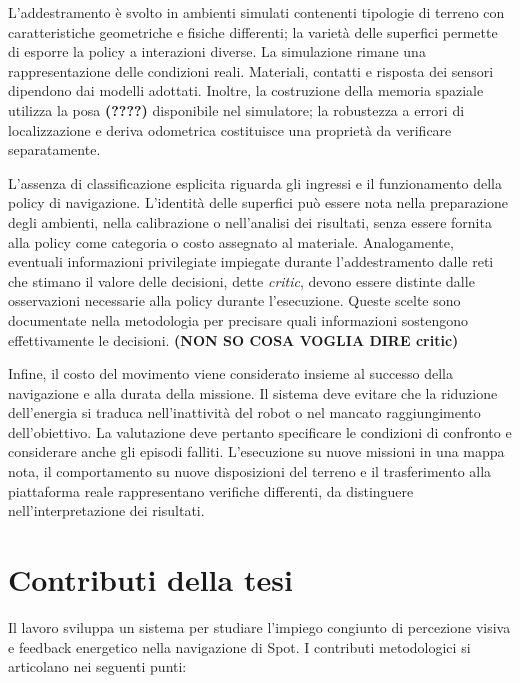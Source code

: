 L'addestramento è svolto in ambienti simulati contenenti tipologie di terreno con caratteristiche geometriche e fisiche differenti; la varietà delle superfici permette di esporre la policy a interazioni diverse. La simulazione rimane una rappresentazione delle condizioni reali. Materiali, contatti e risposta dei sensori dipendono dai modelli adottati. Inoltre, la costruzione della memoria spaziale utilizza la posa \textbf{(????)} disponibile nel simulatore; la robustezza a errori di localizzazione e deriva odometrica costituisce una proprietà da verificare separatamente.

L'assenza di classificazione esplicita riguarda gli ingressi e il funzionamento della policy di navigazione. L'identità delle superfici può essere nota nella preparazione degli ambienti, nella calibrazione o nell'analisi dei risultati, senza essere fornita alla policy come categoria o costo assegnato al materiale. Analogamente, eventuali informazioni privilegiate impiegate durante l'addestramento dalle reti che stimano il valore delle decisioni, dette \emph{critic}, devono essere distinte dalle osservazioni necessarie alla policy durante l'esecuzione. Queste scelte sono documentate nella metodologia per precisare quali informazioni sostengono effettivamente le decisioni. \textbf{(NON SO COSA VOGLIA DIRE critic)}

Infine, il costo del movimento viene considerato insieme al successo della navigazione e alla durata della missione. Il sistema deve evitare che la riduzione dell'energia si traduca nell'inattività del robot o nel mancato raggiungimento dell'obiettivo. La valutazione deve pertanto specificare le condizioni di confronto e considerare anche gli episodi falliti. L'esecuzione su nuove missioni in una mappa nota, il comportamento su nuove disposizioni del terreno e il trasferimento alla piattaforma reale rappresentano verifiche differenti, da distinguere nell'interpretazione dei risultati.

\section{Contributi della tesi}
\label{sec:intro-contributi}

Il lavoro sviluppa un sistema per studiare l'impiego congiunto di percezione visiva e feedback energetico nella navigazione di Spot. I contributi metodologici si articolano nei seguenti punti:

